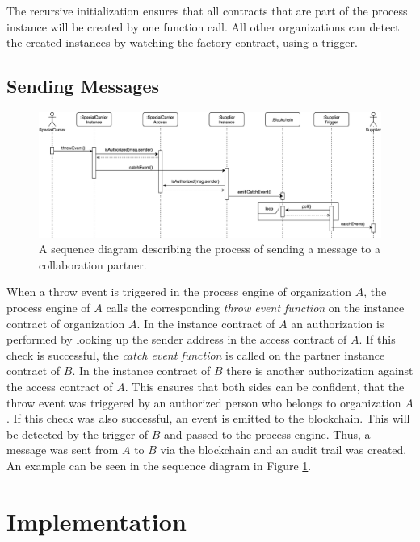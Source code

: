 \documentclass[runningheads]{llncs}
\begin{document}
The recursive initialization ensures that all contracts that are part of the process instance will be created by one function call.
All other organizations can detect the created instances by watching the factory contract, using a trigger.

\subsection{Sending Messages}
\begin{figure}
	\centering
	\includegraphics[width=\textwidth]{fig/event_sending.eps}
	\caption{A sequence diagram describing the process of sending a message to a collaboration partner.}
	\label{fig:event_sending}
\end{figure}

When a throw event is triggered in the process engine of organization $A$, the process engine of $A$ calls the corresponding \emph{throw event function} on the instance contract of organization $A$.
In the instance contract of $A$ an authorization is performed by looking up the sender address in the access contract of $A$.
If this check is successful, the \emph{catch event function} is called on the partner instance contract of $B$.
In the instance contract of $B$ there is another authorization against the access contract of $A$.
This ensures that both sides can be confident, that the throw event was triggered by an authorized person who belongs to organization $A$.
If this check was also successful, an event is emitted to the blockchain.
This will be detected by the trigger of $B$ and passed to the process engine.
Thus, a message was sent from $A$ to $B$ via the blockchain and an audit trail was created.
An example can be seen in the sequence diagram in Figure \ref{fig:event_sending}.

\section{Implementation} \label{implementation}
\end{document}

